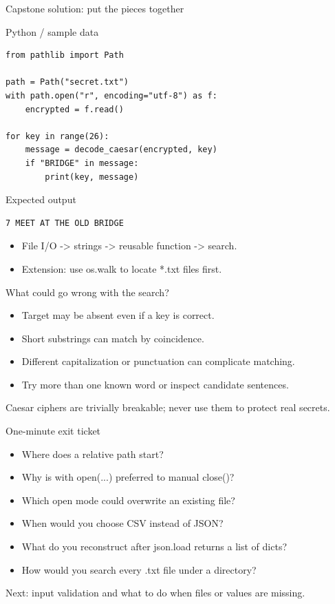 \documentclass[aspectratio=169,10pt]{beamer}
\begin{document}
\begin{frame}[fragile]{Capstone solution: put the pieces together}
\begin{block}{Python / sample data}\begin{Verbatim}[fontsize=\scriptsize]
from pathlib import Path

path = Path("secret.txt")
with path.open("r", encoding="utf-8") as f:
    encrypted = f.read()

for key in range(26):
    message = decode_caesar(encrypted, key)
    if "BRIDGE" in message:
        print(key, message)
\end{Verbatim}
\end{block}
\vspace{-0.07in}\begin{block}{Expected output}\begin{Verbatim}[fontsize=\scriptsize]
7 MEET AT THE OLD BRIDGE
\end{Verbatim}
\end{block}
\small\begin{itemize}
\item File I/O -> strings -> reusable function -> search.
\item Extension: use os.walk to locate *.txt files first.
\end{itemize}
\end{frame}
\begin{frame}[fragile]{What could go wrong with the search?}
\begin{itemize}
\item Target may be absent even if a key is correct.
\item Short substrings can match by coincidence.
\item Different capitalization or punctuation can complicate matching.
\item Try more than one known word or inspect candidate sentences.
\end{itemize}
\vspace{0.1in}\begin{keyidea}\small Caesar ciphers are trivially breakable; never use them to protect real secrets.\end{keyidea}
\end{frame}
\begin{frame}[fragile]{One-minute exit ticket}
\begin{itemize}
\item Where does a relative path start?
\item Why is with open(...) preferred to manual close()?
\item Which open mode could overwrite an existing file?
\item When would you choose CSV instead of JSON?
\item What do you reconstruct after json.load returns a list of dicts?
\item How would you search every .txt file under a directory?
\end{itemize}
\vspace{0.1in}\begin{keyidea}\small Next: input validation and what to do when files or values are missing.\end{keyidea}
\end{frame}
\end{document}
